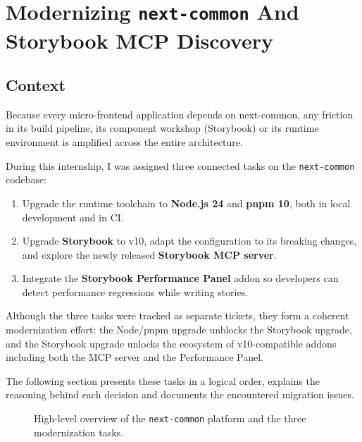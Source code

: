 \section{Modernizing \texttt{next-common} And Storybook MCP Discovery}
\label{sec:storybook-mcp}

\subsection{Context}

Because every micro-frontend application depends on next-common, any friction in its build pipeline, its component workshop (Storybook) or its runtime environment is amplified across the entire architecture.

During this internship, I was assigned three connected tasks on the \texttt{next-common} codebase:

\begin{enumerate}
    \item Upgrade the runtime toolchain to \textbf{Node.js 24} and \textbf{pnpm 10}, both in local development and in \acf{CI}.
    \item Upgrade \textbf{Storybook} to v10, adapt the configuration to its breaking changes, and explore the newly released \textbf{Storybook MCP server}.
    \item Integrate the \textbf{Storybook Performance Panel} addon so developers can detect performance regressions while writing stories.
\end{enumerate}

Although the three tasks were tracked as separate tickets, they form a coherent modernization effort: the Node/pnpm upgrade unblocks the Storybook upgrade, and the Storybook upgrade unlocks the ecosystem of v10-compatible addons including both the MCP server and the Performance Panel.

The following section presents these tasks in a logical order, explains the reasoning behind each decision and documents the encountered migration issues.

\begin{figure}[h]
    \centering
    \caption{High-level overview of the \texttt{next-common} platform and the three modernization tasks.}
    \label{fig:x1-overview}
\end{figure}

